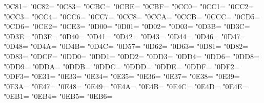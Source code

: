 \XeTeXcharclass"0C81=\KclassCM
\XeTeXcharclass"0C82=\KclassCM
\XeTeXcharclass"0C83=\KclassCM
\XeTeXcharclass"0CBC=\KclassCM
\XeTeXcharclass"0CBE=\KclassCM
\XeTeXcharclass"0CBF=\KclassCM
\XeTeXcharclass"0CC0=\KclassCM
\XeTeXcharclass"0CC1=\KclassCM
\XeTeXcharclass"0CC2=\KclassCM
\XeTeXcharclass"0CC3=\KclassCM
\XeTeXcharclass"0CC4=\KclassCM
\XeTeXcharclass"0CC6=\KclassCM
\XeTeXcharclass"0CC7=\KclassCM
\XeTeXcharclass"0CC8=\KclassCM
\XeTeXcharclass"0CCA=\KclassCM
\XeTeXcharclass"0CCB=\KclassCM
\XeTeXcharclass"0CCC=\KclassCM
\XeTeXcharclass"0CD5=\KclassCM
\XeTeXcharclass"0CD6=\KclassCM
\XeTeXcharclass"0CE2=\KclassCM
\XeTeXcharclass"0CE3=\KclassCM
\XeTeXcharclass"0D00=\KclassCM
\XeTeXcharclass"0D01=\KclassCM
\XeTeXcharclass"0D02=\KclassCM
\XeTeXcharclass"0D03=\KclassCM
\XeTeXcharclass"0D3B=\KclassCM
\XeTeXcharclass"0D3C=\KclassCM
\XeTeXcharclass"0D3E=\KclassCM
\XeTeXcharclass"0D3F=\KclassCM
\XeTeXcharclass"0D40=\KclassCM
\XeTeXcharclass"0D41=\KclassCM
\XeTeXcharclass"0D42=\KclassCM
\XeTeXcharclass"0D43=\KclassCM
\XeTeXcharclass"0D44=\KclassCM
\XeTeXcharclass"0D46=\KclassCM
\XeTeXcharclass"0D47=\KclassCM
\XeTeXcharclass"0D48=\KclassCM
\XeTeXcharclass"0D4A=\KclassCM
\XeTeXcharclass"0D4B=\KclassCM
\XeTeXcharclass"0D4C=\KclassCM
\XeTeXcharclass"0D57=\KclassCM
\XeTeXcharclass"0D62=\KclassCM
\XeTeXcharclass"0D63=\KclassCM
\XeTeXcharclass"0D81=\KclassCM
\XeTeXcharclass"0D82=\KclassCM
\XeTeXcharclass"0D83=\KclassCM
\XeTeXcharclass"0DCF=\KclassCM
\XeTeXcharclass"0DD0=\KclassCM
\XeTeXcharclass"0DD1=\KclassCM
\XeTeXcharclass"0DD2=\KclassCM
\XeTeXcharclass"0DD3=\KclassCM
\XeTeXcharclass"0DD4=\KclassCM
\XeTeXcharclass"0DD6=\KclassCM
\XeTeXcharclass"0DD8=\KclassCM
\XeTeXcharclass"0DD9=\KclassCM
\XeTeXcharclass"0DDA=\KclassCM
\XeTeXcharclass"0DDB=\KclassCM
\XeTeXcharclass"0DDC=\KclassCM
\XeTeXcharclass"0DDD=\KclassCM
\XeTeXcharclass"0DDE=\KclassCM
\XeTeXcharclass"0DDF=\KclassCM
\XeTeXcharclass"0DF2=\KclassCM
\XeTeXcharclass"0DF3=\KclassCM
\XeTeXcharclass"0E31=\KclassCM
\XeTeXcharclass"0E33=\KclassCM
\XeTeXcharclass"0E34=\KclassCM
\XeTeXcharclass"0E35=\KclassCM
\XeTeXcharclass"0E36=\KclassCM
\XeTeXcharclass"0E37=\KclassCM
\XeTeXcharclass"0E38=\KclassCM
\XeTeXcharclass"0E39=\KclassCM
\XeTeXcharclass"0E3A=\KclassCM
\XeTeXcharclass"0E47=\KclassCM
\XeTeXcharclass"0E48=\KclassCM
\XeTeXcharclass"0E49=\KclassCM
\XeTeXcharclass"0E4A=\KclassCM
\XeTeXcharclass"0E4B=\KclassCM
\XeTeXcharclass"0E4C=\KclassCM
\XeTeXcharclass"0E4D=\KclassCM
\XeTeXcharclass"0E4E=\KclassCM
\XeTeXcharclass"0EB1=\KclassCM
\XeTeXcharclass"0EB4=\KclassCM
\XeTeXcharclass"0EB5=\KclassCM
\XeTeXcharclass"0EB6=\KclassCM
